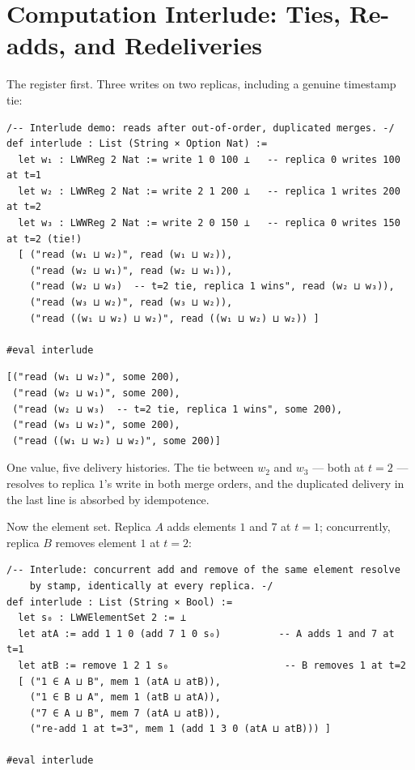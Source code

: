 \documentclass[12pt, a4paper, openright]{book}
\theoremstyle{thmstyle}
\theoremstyle{defstyle}
\begin{document}
\section{Computation Interlude: Ties, Re-adds, and Redeliveries}

The register first. Three writes on two replicas, including a genuine
timestamp tie:

\begin{verbatim}
/-- Interlude demo: reads after out-of-order, duplicated merges. -/
def interlude : List (String × Option Nat) :=
  let w₁ : LWWReg 2 Nat := write 1 0 100 ⊥   -- replica 0 writes 100 at t=1
  let w₂ : LWWReg 2 Nat := write 2 1 200 ⊥   -- replica 1 writes 200 at t=2
  let w₃ : LWWReg 2 Nat := write 2 0 150 ⊥   -- replica 0 writes 150 at t=2 (tie!)
  [ ("read (w₁ ⊔ w₂)", read (w₁ ⊔ w₂)),
    ("read (w₂ ⊔ w₁)", read (w₂ ⊔ w₁)),
    ("read (w₂ ⊔ w₃)  -- t=2 tie, replica 1 wins", read (w₂ ⊔ w₃)),
    ("read (w₃ ⊔ w₂)", read (w₃ ⊔ w₂)),
    ("read ((w₁ ⊔ w₂) ⊔ w₂)", read ((w₁ ⊔ w₂) ⊔ w₂)) ]

#eval interlude
\end{verbatim}

\begin{verbatim}
[("read (w₁ ⊔ w₂)", some 200),
 ("read (w₂ ⊔ w₁)", some 200),
 ("read (w₂ ⊔ w₃)  -- t=2 tie, replica 1 wins", some 200),
 ("read (w₃ ⊔ w₂)", some 200),
 ("read ((w₁ ⊔ w₂) ⊔ w₂)", some 200)]
\end{verbatim}

One value, five delivery histories. The tie between $w_2$ and $w_3$ ---
both at $t=2$ --- resolves to replica $1$'s write in both merge orders,
and the duplicated delivery in the last line is absorbed by idempotence.

Now the element set. Replica $A$ adds elements $1$ and $7$ at $t=1$;
concurrently, replica $B$ removes element $1$ at $t=2$:

\begin{verbatim}
/-- Interlude: concurrent add and remove of the same element resolve
    by stamp, identically at every replica. -/
def interlude : List (String × Bool) :=
  let s₀ : LWWElementSet 2 := ⊥
  let atA := add 1 1 0 (add 7 1 0 s₀)          -- A adds 1 and 7 at t=1
  let atB := remove 1 2 1 s₀                    -- B removes 1 at t=2
  [ ("1 ∈ A ⊔ B", mem 1 (atA ⊔ atB)),
    ("1 ∈ B ⊔ A", mem 1 (atB ⊔ atA)),
    ("7 ∈ A ⊔ B", mem 7 (atA ⊔ atB)),
    ("re-add 1 at t=3", mem 1 (add 1 3 0 (atA ⊔ atB))) ]

#eval interlude
\end{verbatim}
\end{document}
